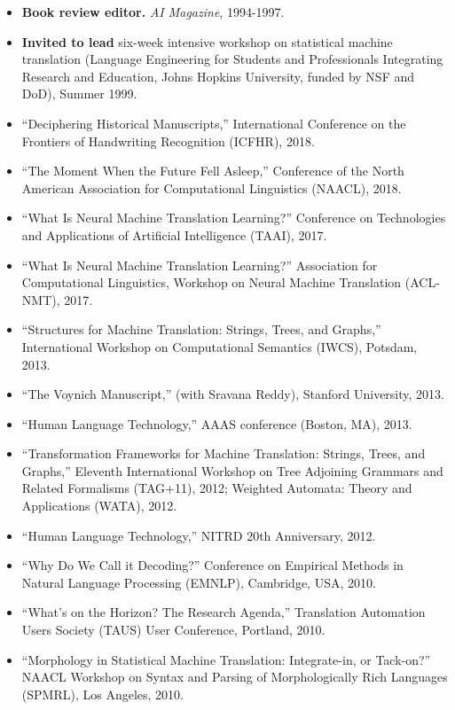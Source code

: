 \begin{itemize}
\item {\bf Book review editor.}  {\em AI Magazine}, 1994-1997.

\item {\bf Invited to lead} six-week intensive workshop on statistical
machine translation (Language Engineering for Students 
and Professionals Integrating Research and Education,
Johns Hopkins University, funded by NSF and DoD), Summer 1999.

\end{itemize}

\pagebreak
{} 

\begin{itemize}
\item ``Deciphering Historical Manuscripts,'' International Conference on the Frontiers of Handwriting Recognition (ICFHR), 2018.
\item ``The Moment When the Future Fell Asleep,'' Conference of the North American Association for Computational Linguistics (NAACL), 2018.
\item ``What Is Neural Machine Translation Learning?'' Conference on Technologies and Applications of Artificial Intelligence (TAAI), 2017.
\item ``What Is Neural Machine Translation Learning?'' Association for Computational Linguistics, Workshop on Neural Machine Translation (ACL-NMT), 2017.
\item ``Structures for Machine Translation: Strings, Trees, and Graphs,'' International Workshop on Computational Semantics (IWCS), Potsdam, 2013.
\item ``The Voynich Manuscript,'' (with Sravana Reddy), Stanford University, 2013.
\item ``Human Language Technology,'' AAAS conference (Boston, MA), 2013.
\item ``Transformation Frameworks for Machine Translation: Strings, Trees, and Graphs,'' Eleventh International Workshop on Tree Adjoining Grammars and Related Formalisms (TAG+11), 2012; Weighted Automata: Theory and Applications (WATA), 2012.
\item ``Human Language Technology,'' NITRD 20th Anniversary, 2012.
\item ``Why Do We Call it Decoding?'' Conference on Empirical Methods in Natural Language Processing (EMNLP), Cambridge, USA, 2010.
\item ``What's on the Horizon?  The Research Agenda,'' Translation Automation Users Society (TAUS) User Conference, Portland, 2010.
\item ``Morphology in Statistical Machine Translation: Integrate-in, or Tack-on?'' NAACL Workshop on Syntax and Parsing of Morphologically Rich Languages (SPMRL), Los Angeles, 2010.

\end{itemize}
